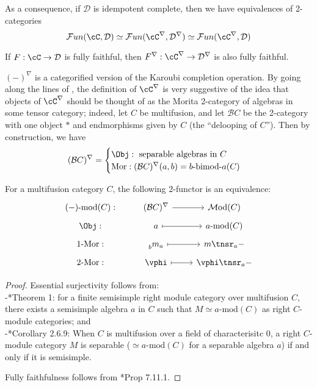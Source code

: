 \documentclass[12pt]{article}
\newcommand{\cB}{{\mathcal{B}}}
\newcommand{\cD}{{\mathcal{D}}}
\newcommand{\Mod}{{\mathcal{M}\textrm{od}}}
\newcommand{\cFun}{{\mathcal{F}un}}
\newcommand{\bimod}[2]{{#1\textrm{-bimod-}#2}}
\newcommand{\amod}[1]{{#1\textrm{-mod}}}
\newcommand{\ModA}[1]{{\Mod(#1)}}
\begin{document}
As a consequence, if $\cD$ is idempotent complete,
then we have equivalences of 2-categories
\[
\cFun(\cC,\cD) \simeq \cFun(\cC^\nabla,\cD^\nabla)
\simeq \cFun(\cC^\nabla, \cD)
\]

\begin{proposition}
If $F: \cC \to \cD$ is fully faithful,
then $F^\nabla: \cC^\nabla \to \cD^\nabla$
is also fully faithful.
\end{proposition}



$(-)^\nabla$ is a categorified version of the
Karoubi completion operation.
By going along the lines of \cite{Ostrik},
the definition of $\cC^\nabla$
is very suggestive of the idea that
objects of $\cC^\nabla$ should be thought of as
the Morita 2-category of algebras in some tensor category;
indeed, let $C$ be multifusion,
and let $\cB C$ be the 2-category with one object $*$
and endmorphisms given by $C$
(the ``delooping of $C$'').
Then by construction, we have
\[
(\cB C)^\nabla =
\begin{cases}
	\Obj: \text{ separable algebras in } C
	\\
	\text{Mor}: (\cB C)^\nabla (a,b) = \bimod{b}{a}(C)
\end{cases}
\]


\begin{proposition}
\label{p:modC-deloop}
For a multifusion category $C$,
the following 2-functor is an equivalence:
\[
\begin{tikzcd}[row sep = tiny]
\amod{(-)}(C) :
	& (\cB C)^\nabla
	\ar[r]
	& \ModA{C}
\\
\Obj:
	& a
	\ar[r,mapsto]
	& \amod{a}(C)
\\
1\textrm{-Mor}:
	& \prescript{}{b}m_a
	\ar[r,mapsto]
	& m \tnsr_a -
\\
2\textrm{-Mor}:
	& \vphi
	\ar[r,mapsto]
	& \vphi \tnsr_a -
\end{tikzcd}
\]
\end{proposition}

\begin{proof}
Essential surjectivity follows from:\\
-\cite{Ostrik}*{Theorem 1}: for a finite semisimple right module
category over multifusion $C$, there exists a semisimple algebra
$a$ in $C$ such that $M \simeq \amod{a}(C)$
as right $C$-module categories; and\\
-\cite{DSPSb}*{Corollary 2.6.9}: When $C$ is multifusion over
a field of characterisitc 0,
a right $C$-module category $M$ is separable
($\simeq \amod{a}(C)$ for a separable algebra $a$)
if and only if it is semisimple.

Fully faithfulness follows from \cite{EGNO}*{Prop 7.11.1}.
\end{proof}
\end{document}
